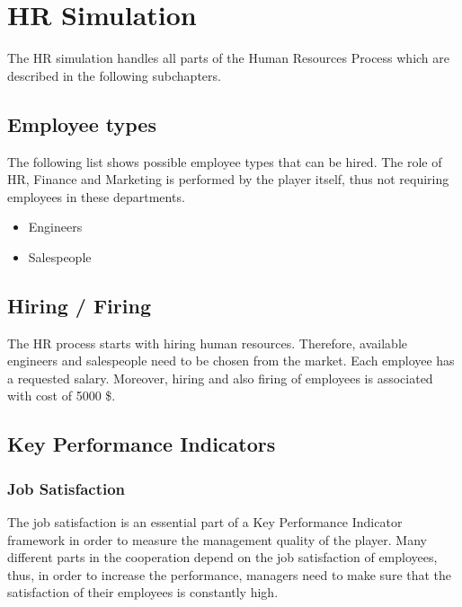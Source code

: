 \section{HR Simulation}
\label{sec:HRsim}
The HR simulation handles all parts of the Human Resources Process which are described in the following subchapters.
\subsection{Employee types}
The following list shows possible employee types that can be hired. The role of HR, Finance and Marketing is performed by the player itself, thus not requiring employees in these departments.
\begin{itemize}
    \item Engineers %
    \item Salespeople \\
\end{itemize}

\subsection{Hiring / Firing}
The HR process starts with hiring human resources. Therefore, available engineers and salespeople need to be chosen from the market. Each employee has a requested salary. Moreover, hiring and also firing of employees is associated with cost of 5000 \$. \cite{recruiterbox}

\subsection{Key Performance Indicators}
\label{sub:KPI}
\subsubsection{Job Satisfaction}
The job satisfaction is an essential part of a Key Performance Indicator framework in order to measure the management quality of the player. Many different parts in the cooperation depend on the job satisfaction of employees, thus, in order to increase the performance, managers need to make sure that the satisfaction of their employees is constantly high. \cite{KOYS}

